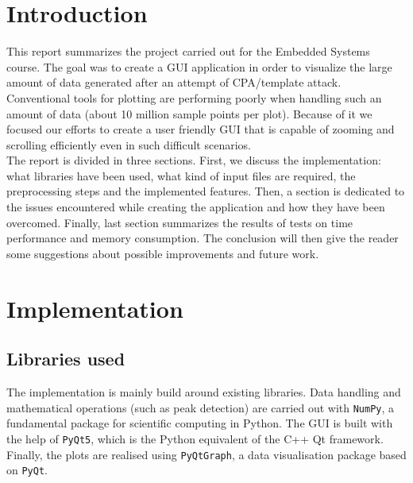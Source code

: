 \documentclass[11pt,a4paper]{article}
\begin{document}




\section{Introduction}
\label{sec:introduction}

This report summarizes the project carried out for the Embedded Systems course. The goal was to create a GUI application in order to visualize the large amount of data generated after an attempt of CPA/template attack. Conventional tools for plotting are performing poorly when handling such an amount of data (about 10 million sample points per plot). Because of it we focused our efforts to create a user friendly GUI that is capable of zooming and scrolling efficiently even in such difficult scenarios.\\

The report is divided in three sections. First, we discuss the implementation: what libraries have been used, what kind of input files are required, the preprocessing steps and the implemented features. Then, a section is dedicated to the issues encountered while creating the application and how they have been overcomed. Finally, last section summarizes the results of tests on time performance and memory consumption. The conclusion will then give the reader some suggestions about possible improvements and future work.



\section{Implementation}
\label{sec:implementation}

\subsection{Libraries used}
The implementation is mainly build around existing libraries. Data handling and mathematical operations (such as peak detection) are carried out with \texttt{NumPy}, a fundamental package for scientific computing in Python. The GUI is built with the help of \texttt{PyQt5}, which is the Python equivalent of the C++ Qt framework. Finally, the plots are realised using \texttt{PyQtGraph}, a data visualisation package based on \texttt{PyQt}. 
\end{document}
